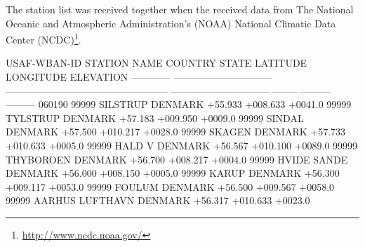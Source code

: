 The station list was received together when the received data from The National Oceanic and Atmospheric Administration's (NOAA) National Climatic Data Center (NCDC)\footnote{\url{http://www.ncdc.noaa.gov/}}.
\newline 

\noindent   USAF-WBAN-ID STATION NAME                   COUNTRY                                            STATE 			      LATITUDE LONGITUDE ELEVATION
------------ ------------------------------ -------------------------------------------------- ------------------------------ -------- --------- ---------
060190 99999 SILSTRUP                       DENMARK                                                                             +55.933  +008.633   +0041.0 99999 TYLSTRUP                       DENMARK                                                                            +57.183  +009.950   +0009.0 99999 SINDAL                         DENMARK                                                                            +57.500  +010.217   +0028.0 99999 SKAGEN                         DENMARK                                                                            +57.733  +010.633   +0005.0 99999 HALD V                         DENMARK                                                                            +56.567  +010.100   +0089.0 99999 THYBOROEN                      DENMARK                                                                            +56.700  +008.217   +0004.0 99999 HVIDE SANDE                    DENMARK                                                                            +56.000  +008.150   +0005.0 99999 KARUP                          DENMARK                                                                            +56.300  +009.117   +0053.0 99999 FOULUM                         DENMARK                                                                            +56.500  +009.567   +0058.0 99999 AARHUS LUFTHAVN                DENMARK                                                                            +56.317  +010.633   +0023.0\newline
